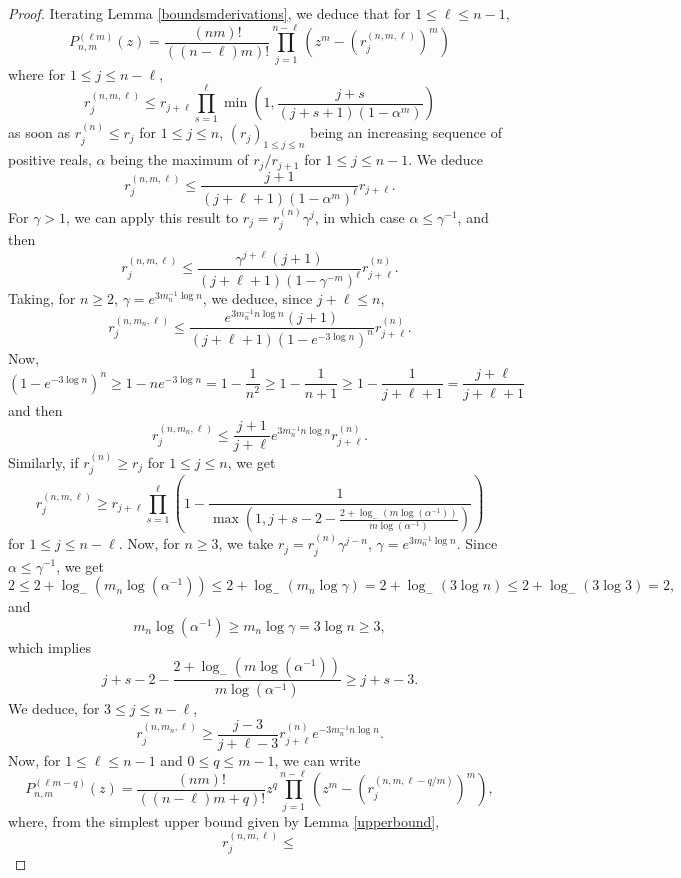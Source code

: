 \documentclass[11pt]{amsart}
\begin{document}
\begin{proof}
    Iterating Lemma \ref{boundsmderivations}, 
we deduce that for $1 \leq \ell \leq n-1$, 
$$P_{n,m}^{(\ell m)} (z)
= \frac{(nm)!}{((n-\ell)m)!} 
\prod_{j=1}^{n-\ell} (z^m -  (r_j^{(n, m, \ell)} )^m )$$
where for $1 \leq j \leq n- \ell$,
$$r_j^{(n, m,\ell)} 
\leq r_{j+\ell} \prod_{s = 1}^{\ell} 
\min \left(1, \frac{j+s}{(j+s+1) (1 - \alpha^m)} \right)  
$$
as soon as $r_j^{(n)} \leq r_j$ for $1 \leq j \leq n$, $(r_j)_{1 \leq j \leq n}$ being an increasing sequence of positive reals, $\alpha$ being the maximum of $r_j/r_{j+1}$ for $1 \leq j \leq n-1$.
We deduce 
$$r_j^{(n,m,\ell)} \leq \frac{j+1}{(j+ \ell +1 )(1 - \alpha^m)^{\ell}} r_{j+\ell}.$$
For $\gamma > 1$, we can apply this 
result to $r_j = r_j^{(n)} \gamma^j$, 
in which case $\alpha \leq \gamma^{-1}$, and then 
$$r_j^{(n,m,\ell)} \leq \frac{\gamma^{j+ \ell}(j+1)}{(j+ \ell +1 )(1 - \gamma^{-m})^{\ell}}  r^{(n)}_{j+\ell}.$$
Taking, for $n \geq 2$, $\gamma = e^{ 3 m_n^{-1} \log n}$, we deduce, 
since $j+ \ell \leq n$, 
$$r_j^{(n,m_n,\ell)} \leq \frac{e^{3 m_n^{-1} n \log n}(j+1)}{(j+ \ell +1 ) \left(1 - e^{-3 \log n} \right)^{n}}  r^{(n)}_{j+\ell}.$$
 Now, 
$$(1 - e^{-3 \log n})^n \geq 1 - n e^{-3 \log n} 
= 1 - \frac{1}{n^2} \geq 1 - \frac{1}{n+1} \geq 1 - 
\frac{1}{j+\ell+1} = \frac{j+\ell}{j+\ell+1}$$
and then 
$$r_j^{(n, m_n, \ell)} \leq \frac{j+1}{j+\ell} 
e^{3 m_n^{-1} n \log n} r_{j+\ell}^{(n)}.$$
Similarly, if $r_j^{(n)} \geq r_j$
for $1 \leq j \leq n$, we get 
$$r_j^{(n,m,  \ell)} 
\geq r_{j+\ell} \prod_{s = 1}^{\ell} 
\left( 1 - \frac{1}{ \max \left(1,  j +s - 2 - \frac{2 + \log_- (m \log (\alpha^{-1}) )}{m \log (\alpha^{-1})}   \right)} \right)$$
for $1 \leq j \leq n - \ell$. 
Now, for $n \geq 3$, we take $r_j = r_j^{(n)} \gamma^{j-n}$, $\gamma = e^{3 m_n^{-1} \log n}$. 
Since $\alpha \leq \gamma^{-1}$, we get 
$$2 \leq 2 + \log_- (m_n \log (\alpha^{-1}))
\leq 2 + \log_- (m_n \log \gamma)
= 2 + \log_- (3 \log n) 
\leq 2 + \log_- (3 \log 3) = 2,$$
and 
$$m_n \log (\alpha^{-1}) \geq m_n \log \gamma
= 3 \log n \geq 3,$$
which implies 
$$j + s - 2 - \frac{2 + \log_- (m \log (\alpha^{-1}) )}{m \log (\alpha^{-1})}  
\geq j + s -3.$$
 We deduce, for $3 \leq j \leq n- \ell$, 
 $$r_j^{(n, m_n, \ell)}  
 \geq \frac{j-3}{j+\ell - 3} r^{(n)}_{j+ \ell}
 e^{-3 m_n^{-1} n \log n}. 
 $$
Now, for $1 \leq \ell \leq n-1$
and $0 \leq q \leq m-1$,
we can write 
$$P_{n,m}^{(\ell m - q)} (z) 
= \frac{(nm)!}{((n-\ell)m + q)!}
z^q \prod_{j=1}^{n-\ell}
(z^m - (r_j^{(n,m,\ell-q/m)})^m),
$$
where, from the simplest upper bound given by Lemma \ref{upperbound}, 
$$r_j^{(n,m, \ell)} \leq 
$$
\end{proof}
\end{document}
